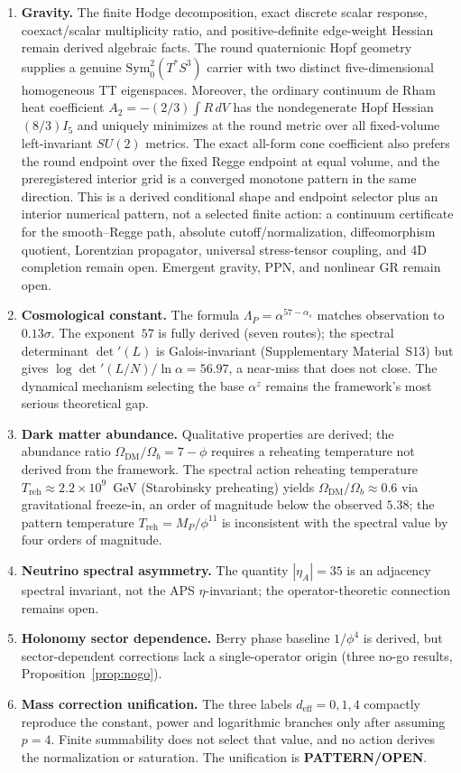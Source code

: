\documentclass[12pt,a4paper]{article}
\theoremstyle{definition}
\begin{document}
\begin{enumerate}
\item \textbf{Gravity.} The finite Hodge decomposition, exact discrete scalar response, coexact/scalar multiplicity ratio, and positive-definite edge-weight Hessian remain derived algebraic facts.  The round quaternionic Hopf geometry supplies a genuine $\mathrm{Sym}^2_0(T^*S^3)$ carrier with two distinct five-dimensional homogeneous TT eigenspaces.  Moreover, the ordinary continuum de Rham heat coefficient $A_2=-(2/3)\int R\,dV$ has the nondegenerate Hopf Hessian $(8/3)I_5$ and uniquely minimizes at the round metric over all fixed-volume left-invariant $SU(2)$ metrics.  The exact all-form cone coefficient also prefers the round endpoint over the fixed Regge endpoint at equal volume, and the preregistered interior grid is a converged monotone pattern in the same direction.  This is a derived conditional shape and endpoint selector plus an interior numerical pattern, not a selected finite action: a continuum certificate for the smooth--Regge path, absolute cutoff/normalization, diffeomorphism quotient, Lorentzian propagator, universal stress-tensor coupling, and 4D completion remain open.  Emergent gravity, PPN, and nonlinear GR remain open.
\item \textbf{Cosmological constant.} The formula $\Lambda_P = \alpha^{57-\alpha_s}$ matches observation to $0.13\sigma$.  The exponent~$57$ is fully derived (seven routes); the spectral determinant $\det'(L)$ is Galois-invariant (Supplementary Material~S13) but gives $\log\det'(L/N)/\ln\alpha = 56.97$, a near-miss that does not close.  The dynamical mechanism selecting the base $\alpha^z$ remains the framework's most serious theoretical gap.
\item \textbf{Dark matter abundance.} Qualitative properties are derived; the abundance ratio $\Omega_{\text{DM}}/\Omega_b = 7-\phi$ requires a reheating temperature not derived from the framework.  The spectral action reheating temperature $T_{\text{reh}} \approx 2.2 \times 10^9$~GeV (Starobinsky preheating) yields $\Omega_{\text{DM}}/\Omega_b \approx 0.6$ via gravitational freeze-in, an order of magnitude below the observed $5.38$; the pattern temperature $T_{\text{reh}} = M_P/\phi^{11}$ is inconsistent with the spectral value by four orders of magnitude.
\item \textbf{Neutrino spectral asymmetry.} The quantity $|\eta_A| = 35$ is an adjacency spectral invariant, not the APS $\eta$-invariant; the operator-theoretic connection remains open.
\item \textbf{Holonomy sector dependence.} Berry phase baseline $1/\phi^4$ is derived, but sector-dependent corrections lack a single-operator origin (three no-go results, Proposition~\ref{prop:nogo}).
\item \textbf{Mass correction unification.} The three labels $d_{\text{eff}}=0,1,4$ compactly reproduce the constant, power and logarithmic branches only after assuming $p=4$.  Finite summability does not select that value, and no action derives the normalization or saturation.  The unification is \textbf{PATTERN/OPEN}.
\end{enumerate}
\end{document}
